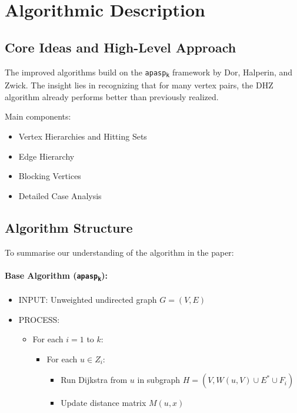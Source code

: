 \documentclass[a4paper,11pt,oneside]{book}
\begin{document}
\section*{Algorithmic Description}

\subsection*{Core Ideas and High-Level Approach}
The improved algorithms build on the \texttt{apasp\textsubscript{k}} framework by Dor, Halperin, and Zwick. The insight lies in recognizing that for many vertex pairs, the DHZ algorithm already performs better than previously realized.

Main components:
\begin{itemize}
    \item Vertex Hierarchies and Hitting Sets
    \item Edge Hierarchy
    \item Blocking Vertices
    \item Detailed Case Analysis
\end{itemize}

\subsection*{Algorithm Structure}
To summarise our understanding of the algorithm in the paper:
\paragraph{ Base Algorithm (\texttt{apasp\textsubscript{k}}):}
\begin{itemize}
    \item INPUT: Unweighted undirected graph $G = (V, E)$
    \item PROCESS:
        \begin{itemize}
            \item For each $i = 1$ to $k$:
                \begin{itemize}
                    \item For each $u \in Z_i$:
                        \begin{itemize}
                            \item Run Dijkstra from $u$ in subgraph $H = (V, W(u,V) \cup E^* \cup F_i)$
                            \item Update distance matrix $M(u,x)$
                        \end{itemize}
                \end{itemize}
        \end{itemize}
\end{itemize}
\end{document}
